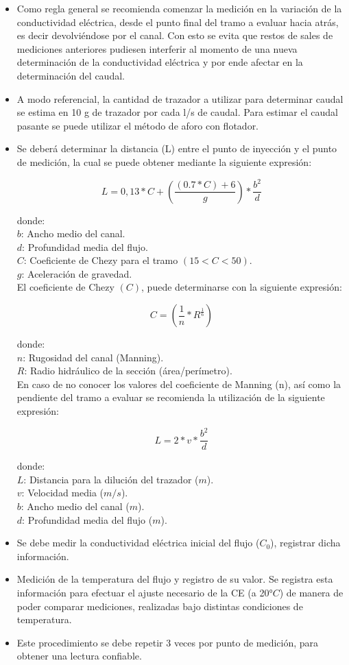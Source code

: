 \documentclass[]{article}
\providecommand{\tightlist}{%
  \setlength{\itemsep}{0pt}\setlength{\parskip}{0pt}}
\begin{document}
\begin{itemize}
\tightlist
\item Como regla general se recomienda comenzar la medición en la variación de la conductividad eléctrica, desde el punto final del tramo a evaluar hacia atrás, es decir devolviéndose por el canal. Con esto se evita que restos de sales de mediciones anteriores pudiesen interferir al momento de una nueva determinación de la conductividad eléctrica y por ende afectar en la determinación del caudal.
\item A modo referencial, la cantidad de trazador a utilizar para determinar caudal se estima en 10 g de trazador por cada l/s de caudal. Para estimar el caudal pasante se puede utilizar el método de aforo con flotador.
\item Se deberá determinar la distancia (L) entre el punto de inyección y el punto de medición, la cual se puede obtener mediante la siguiente expresión:

\[L=0,13*C+\left(\frac{(0.7*C)+6}{g}\right)*\frac{b^2}{d}\]

donde:\\
\(b\): Ancho medio del canal.\\
\(d\): Profundidad media del flujo.\\
\(C\): Coeficiente de Chezy para el tramo $(15<C<50)$.\\
\(g\): Aceleración de gravedad.\\
El coeficiente de Chezy $(C)$, puede determinarse con la siguiente expresión:

\[C=\left(\frac{1}{n}*R^\frac{1}{6}\right)\]

donde:\\
\(n\): Rugosidad del canal (Manning).\\
\(R\): Radio hidráulico de la sección (área/perímetro).\\
En caso de no conocer los valores del coeficiente de Manning (n), así como la pendiente
del tramo a evaluar se recomienda la utilización de la siguiente expresión:

\[L=2*v*\frac{b^2}{d}\]

donde:\\
\(L\): Distancia para la dilución del trazador ($m$).\\
\(v\): Velocidad media ($m/s$).\\
\(b\): Ancho medio del canal ($m$).\\
\(d\): Profundidad media del flujo ($m$).\\
\item Se debe medir la conductividad eléctrica inicial del flujo ($C_0$), registrar dicha información.
\item Medición de la temperatura del flujo y registro de su valor. Se registra esta información para efectuar el ajuste necesario de la CE (a 20°$C$) de manera de poder comparar mediciones, realizadas bajo distintas condiciones de temperatura.
\item Este procedimiento se debe repetir 3 veces por punto de medición, para obtener una lectura confiable.
\end{itemize}
\end{document}
